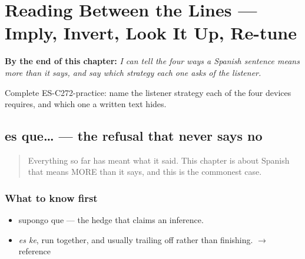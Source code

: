 
\chapter{Reading Between the Lines --- Imply, Invert, Look It Up, Re-tune}
\label{ch:entrelineas}

\begin{chapteropening}
\textbf{By the end of this chapter:} \emph{I can tell the four ways a Spanish sentence means more than it says, and say which strategy each one asks of the listener.}

Complete ES-C272-practice: name the listener strategy each of the four devices requires, and which one a written text hides.
\end{chapteropening}

\section[es que…]{es que… — the refusal that never says no}

\label{lesson:ES-C272-es-que}



\begin{quote}
Everything so far has meant what it said. This chapter is about Spanish that means MORE than it says, and this is the commonest case.
\end{quote}

\subsection*{What to know first}
\begin{itemize}
\raggedright
  \item supongo que — the hedge that claims an inference.
\end{itemize}

\begin{sounds}
\begin{itemize}
\raggedright
  \item \emph{es ke}, run together, and usually trailing off rather than finishing. $\to$ reference
\end{itemize}
\end{sounds}

